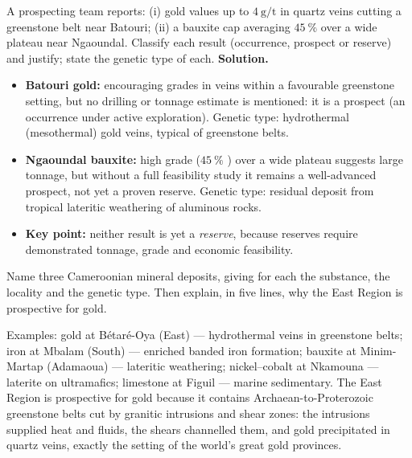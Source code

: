 \documentclass[11pt]{article}
\newcommand{\cle}[1]{{\popxbold\color{popdark}#1}}
\begin{document}
\begin{exoresolu}
A prospecting team reports: (i) gold values up to $4\ \mathrm{g/t}$ in quartz veins cutting a greenstone belt near Batouri; (ii) a bauxite cap averaging $45\ \%$  over a wide plateau near Ngaoundal. Classify each result (occurrence, prospect or reserve) and justify; state the genetic type of each.
\tcblower
\textbf{Solution.}
\begin{itemize}
\item \textbf{Batouri gold:} encouraging grades in veins within a favourable greenstone setting, but no drilling or tonnage estimate is mentioned: it is a \cle{prospect} (an occurrence under active exploration). Genetic type: hydrothermal (mesothermal) gold veins, typical of greenstone belts.
\item \textbf{Ngaoundal bauxite:} high grade ($45\ \%$ ) over a wide plateau suggests large tonnage, but without a full feasibility study it remains a well-advanced \cle{prospect}, not yet a proven reserve. Genetic type: residual deposit from tropical lateritic weathering of aluminous rocks.
\item \textbf{Key point:} neither result is yet a \emph{reserve}, because reserves require demonstrated tonnage, grade and economic feasibility.
\end{itemize}
\end{exoresolu}

\begin{exercice}
Name three Cameroonian mineral deposits, giving for each the substance, the locality and the genetic type. Then explain, in five lines, why the East Region is prospective for gold.
\end{exercice}

\begin{corrige}[Exercise 1]
Examples: gold at B\'etar\'e-Oya (East) --- hydrothermal veins in greenstone belts; iron at Mbalam (South) --- enriched banded iron formation; bauxite at Minim-Martap (Adamaoua) --- lateritic weathering; nickel--cobalt at Nkamouna --- laterite on ultramafics; limestone at Figuil --- marine sedimentary. The East Region is prospective for gold because it contains Archaean-to-Proterozoic greenstone belts cut by granitic intrusions and shear zones: the intrusions supplied heat and fluids, the shears channelled them, and gold precipitated in quartz veins, exactly the setting of the world's great gold provinces.
\end{corrige}
\end{document}
